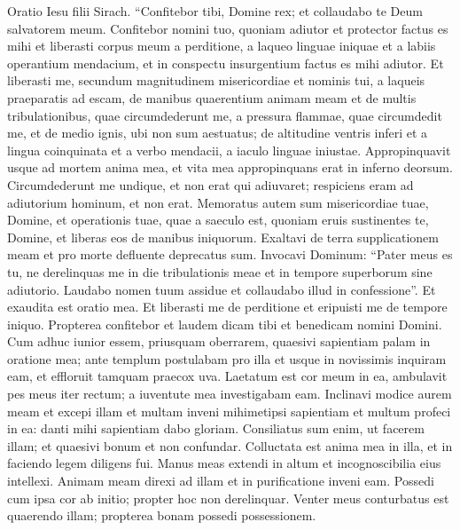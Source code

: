 \begin{biblechapter}  
\verse Oratio Iesu filii Sirach. “Confitebor tibi, Domine rex; et collaudabo te Deum salvatorem meum. 
\verse Confitebor nomini tuo, quoniam adiutor et protector factus es mihi 
\verse et liberasti corpus meum a perditione, a laqueo linguae iniquae et a labiis operantium mendacium, et in conspectu insurgentium factus es mihi adiutor. 
\verse Et liberasti me, secundum magnitudinem misericordiae et nominis tui, a laqueis praeparatis ad escam, 
\verse de manibus quaerentium animam meam et de multis tribulationibus, quae circumdederunt me, 
\verse a pressura flammae, quae circumdedit me, et de medio ignis, ubi non sum aestuatus; 
\verse de altitudine ventris inferi et a lingua coinquinata et a verbo mendacii, a iaculo linguae iniustae. 
\verse Appropinquavit usque ad mortem anima mea, 
\verse et vita mea appropinquans erat in inferno deorsum. 
\verse Circumdederunt me undique, et non erat qui adiuvaret; respiciens eram ad adiutorium hominum, et non erat. 
\verse Memoratus autem sum misericordiae tuae, Domine, et operationis tuae, quae a saeculo est, 
\verse quoniam eruis sustinentes te, Domine, et liberas eos de manibus iniquorum. 
\verse Exaltavi de terra supplicationem meam et pro morte defluente deprecatus sum. 
\verse Invocavi Dominum: “Pater meus es tu, ne derelinquas me in die tribulationis meae et in tempore superborum sine adiutorio. 
\verse Laudabo nomen tuum assidue et collaudabo illud in confessione”. Et exaudita est oratio mea. 
\verse Et liberasti me de perditione et eripuisti me de tempore iniquo. 
\verse Propterea confitebor et laudem dicam tibi et benedicam nomini Domini. 
\verse Cum adhuc iunior essem, priusquam oberrarem, quaesivi sapientiam palam in oratione mea; 
\verse ante templum postulabam pro illa et usque in novissimis inquiram eam, et effloruit tamquam praecox uva. 
\verse Laetatum est cor meum in ea, ambulavit pes meus iter rectum; a iuventute mea investigabam eam. 
\verse Inclinavi modice aurem meam et excepi illam 
\verse et multam inveni mihimetipsi sapientiam et multum profeci in ea: 
\verse danti mihi sapientiam dabo gloriam. 
\verse Consiliatus sum enim, ut facerem illam; et quaesivi bonum et non confundar. 
\verse Colluctata est anima mea in illa, et in faciendo legem diligens fui. 
\verse Manus meas extendi in altum et incognoscibilia eius intellexi. 
\verse Animam meam direxi ad illam et in purificatione inveni eam. 
\verse Possedi cum ipsa cor ab initio; propter hoc non derelinquar. 
\verse Venter meus conturbatus est quaerendo illam; propterea bonam possedi possessionem. 

\end{biblechapter}
